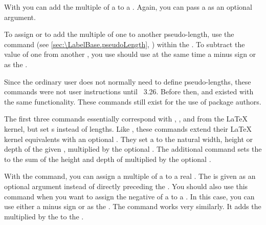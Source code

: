 With  you can add the multiple of a  to a
. Again, you can pass a  as an optional
argument.

To assign or to add the multiple of one  to another
pseudo-length, use the  command (see
\autoref{sec:\LabelBase.pseudoLength}, )
within the . To subtract the value of one 
from another , you use should use at the same time a
minus sign or  as the .

%
%
Since the ordinary user does not normally need to define pseudo-lengths, these
commands were not user instructions until \KOMAScript~3.26. Before then,
 and  existed with the
same functionality. These commands still exist for the use of package authors.%
\EndIndexGroup

\begin{Declaration}
\end{Declaration}
The first three
commands essentially correspond with ,
, and  from the \LaTeX{} kernel, but set
s instead of lengths. Like 
, these commands extend their \LaTeX{}
kernel equivalents with an optional . They set a
 to the natural width, height or depth of the given
, multiplied by the optional . The additional
command  sets the  to the
sum of the height and depth of  multiplied by the optional
.%
\EndIndexGroup


\begin{Declaration}
\end{Declaration}
With the  command, you can assign a multiple of a
 to a real .  The  is given
as an optional argument instead of directly preceding the
. You should also use this command when you want to
assign the negative of a  to a . In this
case, you can use either a minus sign or  as the .
The  command works very similarly. It adds the
 multiplied by the  to the .%
%
\EndIndexGroup
%
\EndIndexGroup


